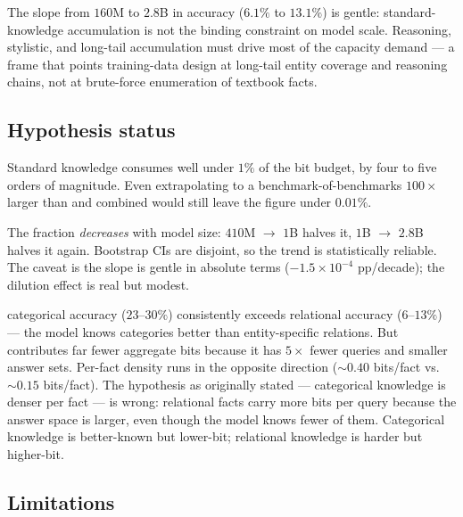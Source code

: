  The slope from \(160\)M to \(2.8\)B in \bear accuracy (\(6.1\%\) to \(13.1\%\)) is gentle: standard-knowledge accumulation is not the binding constraint on model scale. Reasoning, stylistic, and long-tail accumulation must drive most of the capacity demand --- a frame that points training-data design at long-tail entity coverage and reasoning chains, not at brute-force enumeration of textbook facts.

\subsection{Hypothesis status}

 Standard knowledge consumes well under \(1\%\) of the bit budget, by four to five orders of magnitude. Even extrapolating to a benchmark-of-benchmarks \(100\times\) larger than \bear and \taxi combined would still leave the figure under \(0.01\%\).

 The fraction \emph{decreases} with model size: \(410\)M \(\to\) \(1\)B halves it, \(1\)B \(\to\) \(2.8\)B halves it again. Bootstrap CIs are disjoint, so the trend is statistically reliable. The caveat is the slope is gentle in absolute terms (\(-1.5 \times 10^{-4}\) pp/decade); the dilution effect is real but modest.

 \taxi categorical accuracy (\(23\)--\(30\%\)) consistently exceeds \bear relational accuracy (\(6\)--\(13\%\)) --- the model knows categories better than entity-specific relations. But \taxi contributes far fewer aggregate bits because it has \(5\times\) fewer queries and smaller answer sets. Per-fact density runs in the opposite direction (\bear \(\sim 0.40\) bits/fact vs.\ \taxi \(\sim 0.15\) bits/fact). The hypothesis as originally stated --- categorical knowledge is denser per fact --- is wrong: relational facts carry more bits per query because the answer space is larger, even though the model knows fewer of them. Categorical knowledge is better-known but lower-bit; relational knowledge is harder but higher-bit.

\subsection{Limitations}

